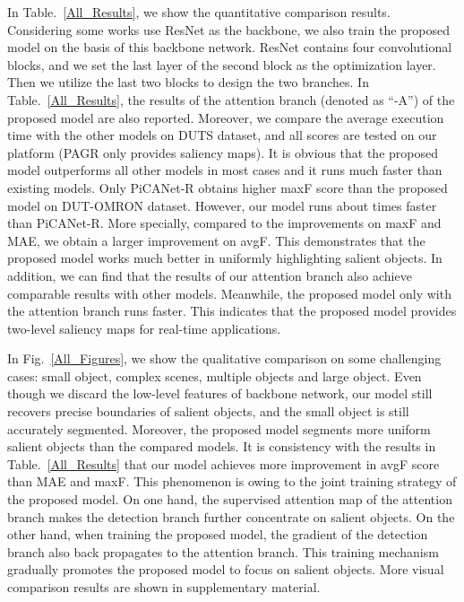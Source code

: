 \documentclass[10pt,twocolumn,letterpaper]{article}
\begin{document}
In Table.~\ref{All_Results}, we show the quantitative comparison results. Considering some works use ResNet as the backbone, we also train the proposed model on the basis of this backbone network.
ResNet contains four convolutional blocks, and we set the last layer of the second block as the optimization layer. Then we utilize the last two blocks to design the two branches. In Table.~\ref{All_Results}, the results of the attention branch (denoted as ``-A'') of the proposed model are also reported. Moreover, we compare the average execution time with the other models on DUTS dataset, and all scores are tested on our platform (PAGR only provides saliency maps). It is obvious that the proposed model outperforms all other models in most cases and it runs much faster than existing models. Only PiCANet-R obtains higher maxF score than the proposed model on DUT-OMRON dataset. However, our model runs about  times faster than PiCANet-R. More specially, compared to the improvements on maxF and MAE, we obtain a larger improvement on avgF. This demonstrates that the proposed model works much better in uniformly highlighting salient objects. In addition, we can find that the results of our attention branch also achieve comparable results with other models. Meanwhile, the proposed model only with the attention branch runs faster. This indicates that the proposed model provides two-level saliency maps for real-time applications.

In Fig.~\ref{All_Figures}, we show the qualitative comparison on some challenging cases: small object, complex scenes, multiple objects and large object. Even though we discard the low-level features of backbone network, our model still recovers precise boundaries of salient objects, and the small object is still accurately segmented. Moreover, the proposed model segments more uniform salient objects than the compared models. It is consistency with the results in Table.~\ref{All_Results} that our model achieves more improvement in avgF score than MAE and maxF. This phenomenon is owing to the joint training strategy of the proposed model. On one hand, the supervised attention map of the attention branch makes the detection branch further concentrate on salient objects. On the other hand, when training the proposed model, the gradient of the detection branch also back propagates to the attention branch. This training mechanism gradually promotes the proposed model to focus on salient objects. More visual comparison results are shown in supplementary material.
\end{document}
